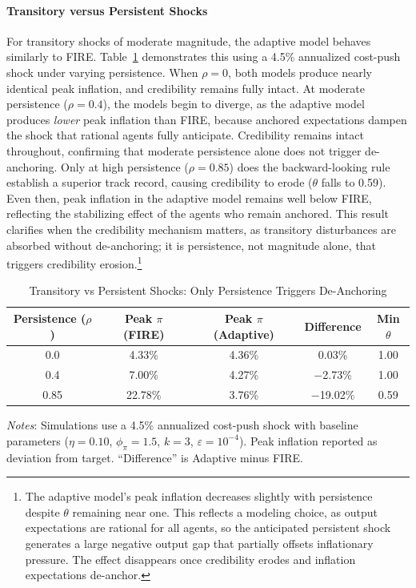 \documentclass[10pt]{article}
\begin{document}
\paragraph{Transitory versus Persistent Shocks}

For transitory shocks of moderate magnitude, the adaptive model behaves similarly to FIRE. Table~\ref{tab:transitory_persistent} demonstrates this using a 4.5\% annualized cost-push shock under varying persistence. When $\rho = 0$, both models produce nearly identical peak inflation, and credibility remains fully intact. At moderate persistence ($\rho = 0.4$), the models begin to diverge, as the adaptive model produces \textit{lower} peak inflation than FIRE, because anchored expectations dampen the shock that rational agents fully anticipate. Credibility remains intact throughout, confirming that moderate persistence alone does not trigger de-anchoring. Only at high persistence ($\rho = 0.85$) does the backward-looking rule establish a superior track record, causing credibility to erode ($\theta$ falls to 0.59). Even then, peak inflation in the adaptive model remains well below FIRE, reflecting the stabilizing effect of the agents who remain anchored. This result clarifies when the credibility mechanism matters, as transitory disturbances are absorbed without de-anchoring; it is persistence, not magnitude alone, that triggers credibility erosion.\footnote{The adaptive model's peak inflation decreases slightly with persistence despite $\theta$ remaining near one. This reflects a modeling choice, as output expectations are rational for all agents, so the anticipated persistent shock generates a large negative output gap that partially offsets inflationary pressure. The effect disappears once credibility erodes and inflation expectations de-anchor.}

\begin{table}[htbp]
\centering
\caption{Transitory vs Persistent Shocks: Only Persistence Triggers De-Anchoring}
\label{tab:transitory_persistent}
\begin{tabular}{ccccc}
\toprule
Persistence ($\rho$) & Peak $\pi$ (FIRE) & Peak $\pi$ (Adaptive) & Difference & Min $\theta$ \\
\midrule
0.0 & 4.33\% & 4.36\% & 0.03\% & 1.00 \\
0.4 & 7.00\% & 4.27\% & $-$2.73\% & 1.00 \\
0.85 & 22.78\% & 3.76\% & $-$19.02\% & 0.59 \\
\bottomrule
\end{tabular}
\begin{tablenotes}
\small
\item \textit{Notes}: Simulations use a 4.5\% annualized cost-push shock with baseline parameters ($\eta = 0.10$, $\phi_\pi = 1.5$, $k = 3$, $\varepsilon = 10^{-4}$). Peak inflation reported as deviation from target. ``Difference'' is Adaptive minus FIRE.
\end{tablenotes}
\end{table}
\end{document}
